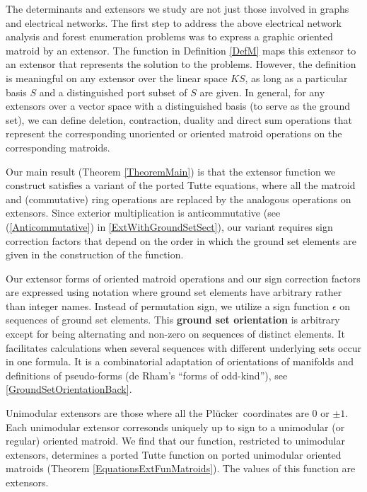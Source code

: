 \documentclass[12pt]{article}
\theoremstyle{definition}
\newcommand{\FieldK}{\ensuremath{K}}
\newcommand{\Plucker}{Pl\"{u}cker\ }
\begin{document}
The determinants and extensors we study are not just those involved
in graphs and electrical networks.  The first step to address the
above electrical network analysis and forest enumeration problems
was to express a graphic oriented matroid by an extensor.  The function
in Definition \ref{DefM} maps this extensor to an extensor that represents the
solution to the problems.  However, the definition is meaningful
on any extensor over the linear space $\FieldK S$, as long as a particular
basis $S$ and a distinguished port subset of $S$ are given.  In general,
for any extensors over a vector space with a distinguished basis
(to serve as the ground set), we can define deletion, contraction, duality
and direct sum operations that 
represent the corresponding unoriented or oriented 
matroid operations on the corresponding matroids.

Our main result (Theorem \ref{TheoremMain}) is that the extensor function we construct satisfies
a variant of the ported Tutte equations, where all the matroid and 
(commutative) ring operations are replaced by the analogous operations
on extensors.  Since exterior multiplication is anticommutative
(see (\ref{Anticommutative}) in \textsection \ref{ExtWithGroundSetSect}), 
our variant requires sign correction factors that
depend on the order in which the ground set elements are given
in the construction of the function.

Our extensor forms of oriented matroid operations and
our sign correction factors are expressed using
notation where ground set elements have
arbitrary rather than integer names.  Instead of permutation
sign, we utilize a sign function $\epsilon$ on sequences of ground set
elements.  This \textbf{ground set orientation}
is arbitrary except for being alternating and non-zero
on sequences of distinct elements.  It facilitates calculations
when several sequences with different underlying sets occur
in one formula.  It is a combinatorial adaptation
of orientations of manifolds and definitions of pseudo-forms
(de Rham's ``forms of odd-kind''), see 
\textsection\ref{GroundSetOrientationBack}.

Unimodular extensors are those where all the  \Plucker coordinates
are $0$ or $\pm 1$.   Each unimodular extensor corresonds uniquely
up to sign to a unimodular (or regular) oriented matroid.  We find
that our function, restricted to unimodular extensors, determines
a ported Tutte function on ported unimodular oriented matroids
(Theorem \ref{EquationsExtFunMatroids}).  The
values of this function are extensors.
\end{document}

